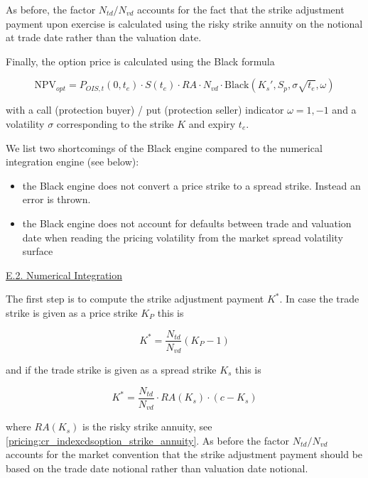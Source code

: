 As before, the factor $N_{td} / N_{vd}$ accounts for the fact that the strike adjustment payment upon exercise is
calculated using the risky strike annuity on the notional at trade date rather than the valuation date.

Finally, the option price is calculated using the Black formula

\begin{equation}\label{pricing:cr_black_spread-volatility}
  \text{NPV}_{opt} = P_{OIS,t}(0,t_e) \cdot S(t_e) \cdot  RA \cdot N_{vd} \cdot \text{Black} \left( K_s', S_p, \sigma\sqrt{t_e}, \omega \right)
\end{equation}

with a call (protection buyer) / put (protection seller) indicator $\omega = 1, -1$ and a volatility $\sigma$
corresponding to the strike $K$ and expiry $t_e$.

We list two shortcomings of the Black engine compared to the numerical integration engine (see below):

\begin{itemize}
\item the Black engine does not convert a price strike to a spread strike. Instead an error is thrown.
\item the Black engine does not account for defaults between trade and valuation date when reading the pricing
  volatility from the market spread volatility surface
\end{itemize}

\underline{E.2. Numerical Integration}

The first step is to compute the strike adjustment payment $K^*$. In case the trade strike is given as a price strike
$K_P$ this is

\begin{equation}
K^* = \frac{N_{td}}{N_{vd}}(K_P - 1)
\end{equation}

and if the trade strike is given as a spread strike $K_s$ this is

\begin{equation}
K^* = \frac{N_{td}}{N_{vd}} \cdot RA(K_s) \cdot ( c - K_s )
\end{equation}

where $RA(K_s)$ is the risky strike annuity, see \ref{pricing:cr_indexcdsoption_strike_annuity}. As before the factor
$N_{td} / N_{vd}$ accounts for the market convention that the strike adjustment payment should be based on the trade
date notional rather than valuation date notional.

